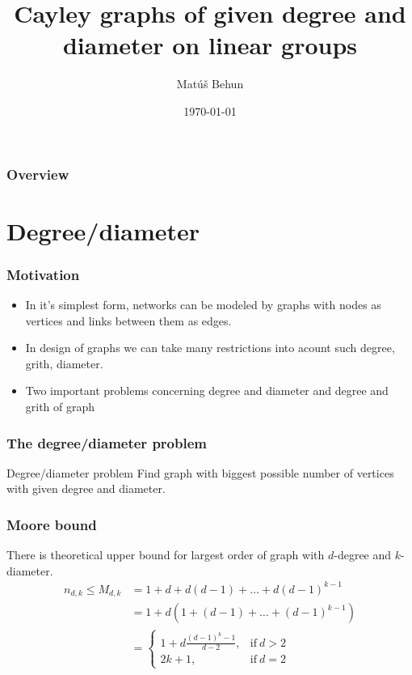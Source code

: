 \documentclass{beamer}
\title[]{Cayley graphs of given degree and diameter on linear groups} %
\author{Mat\'u\v{s} Behun} %
\institute[UCLA] %
{
Slovak University of Technology in Bratislava \\ %
\medskip
}
\date{\today} %
\begin{document}
\begin{frame}
\titlepage 
\end{frame}

\begin{frame}
\frametitle{Overview}
\tableofcontents
\end{frame}

\section{Degree/diameter} 

\begin{frame}
	\frametitle{Motivation}
\begin{itemize}
    \item In it's simplest form, networks can be modeled by graphs with nodes as vertices and links between them as edges.
	\item In design of graphs we can take many restrictions into acount such degree, grith, diameter.
	\item Two important problems concerning degree and diameter and degree and grith of graph
\end{itemize}
\end{frame}
\begin{frame}
\frametitle{The degree/diameter problem}
	\begin{block}{Degree/diameter problem}
		Find graph with biggest possible number of vertices with given degree and diameter.
	\end{block}
\end{frame}
\begin{frame}
	\frametitle{Moore bound}
There is theoretical upper bound for largest order of graph with $d$-degree and $k$-diameter.
\begin{equation}\label{eq:Moore}
	\begin{split}
		n_{d,k} \leq M_{d,k}    & = 1 + d + d(d - 1) + \dots + d(d - 1)^{k-1}  \\
								& = 1 + d(1 + (d - 1) + \dots + (d - 1)^{k-1}) \\
                                & = \begin{cases}
                                        1+d\frac{(d-1)^{k}-1}{d-2}, & \text{if}\ d > 2 \\
                                    	2k+1, & \text{if}\ d=2
    								\end{cases}
    \end{split}
\end{equation}
\end{frame}
\end{document}
